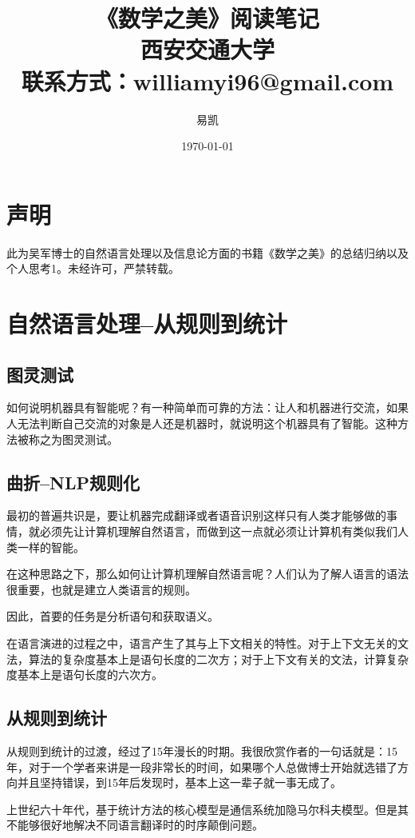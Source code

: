 \documentclass[UTF8]{article}
\title{\huge{《数学之美》阅读笔记\\} \huge{西安交通大学 \\ 联系方式：williamyi96@gmail.com\\ }}
\author{\huge{易凯}}
\date{\Huge\today}
\begin{document}
	\maketitle
	\vspace{100mm}
	\newpage
	\tableofcontents
	\newpage

	\section{声明}
	此为吴军博士的自然语言处理以及信息论方面的书籍《数学之美》的总结归纳以及个人思考1。未经许可，严禁转载。

	\section{自然语言处理--从规则到统计}
	\subsection{图灵测试}
	如何说明机器具有智能呢？有一种简单而可靠的方法：让人和机器进行交流，如果人无法判断自己交流的对象是人还是机器时，就说明这个机器具有了智能。这种方法被称之为图灵测试。

	\subsection{曲折--NLP规则化}
	最初的普遍共识是，要让机器完成翻译或者语音识别这样只有人类才能够做的事情，就必须先让计算机理解自然语言，而做到这一点就必须让计算机有类似我们人类一样的智能。

	在这种思路之下，那么如何让计算机理解自然语言呢？人们认为了解人语言的语法很重要，也就是建立人类语言的规则。

	因此，首要的任务是分析语句和获取语义。

	在语言演进的过程之中，语言产生了其与上下文相关的特性。对于上下文无关的文法，算法的复杂度基本上是语句长度的二次方；对于上下文有关的文法，计算复杂度基本上是语句长度的六次方。

	\subsection{从规则到统计}
	从规则到统计的过渡，经过了15年漫长的时期。我很欣赏作者的一句话就是：15年，对于一个学者来讲是一段非常长的时间，如果哪个人总做博士开始就选错了方向并且坚持错误，到15年后发现时，基本上这一辈子就一事无成了。

	上世纪六十年代，基于统计方法的核心模型是通信系统加隐马尔科夫模型。但是其不能够很好地解决不同语言翻译时的时序颠倒问题。
\end{document}
